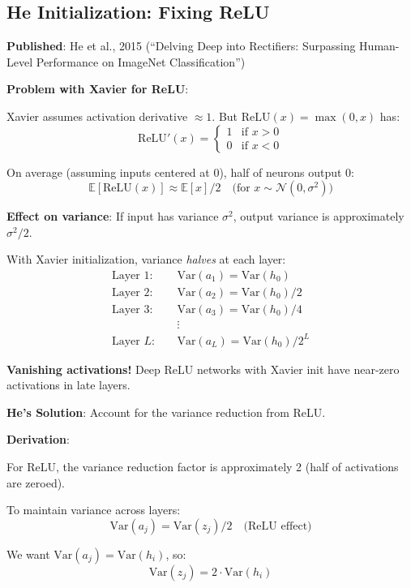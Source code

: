 \documentclass[11pt,oneside]{book}
\begin{document}
\subsection{He Initialization: Fixing ReLU}

\textbf{Published}: He et al., 2015 (``Delving Deep into Rectifiers: Surpassing Human-Level Performance on ImageNet Classification'')

\textbf{Problem with Xavier for ReLU}:

Xavier assumes activation derivative $\approx 1$. But $\text{ReLU}(x) = \max(0, x)$ has:
\[
\text{ReLU}'(x) = \begin{cases}
1 & \text{if } x > 0 \\
0 & \text{if } x < 0
\end{cases}
\]

On average (assuming inputs centered at 0), half of neurons output 0:
\[
\mathbb{E}[\text{ReLU}(x)] \approx \mathbb{E}[x]/2 \quad \text{(for } x \sim \mathcal{N}(0, \sigma^2)\text{)}
\]

\textbf{Effect on variance}: If input has variance $\sigma^2$, output variance is approximately $\sigma^2/2$.

With Xavier initialization, variance \textit{halves} at each layer:
\begin{align*}
\text{Layer 1:} \quad & \text{Var}(a_1) = \text{Var}(h_0) \\
\text{Layer 2:} \quad & \text{Var}(a_2) = \text{Var}(h_0)/2 \\
\text{Layer 3:} \quad & \text{Var}(a_3) = \text{Var}(h_0)/4 \\
&\vdots \\
\text{Layer } L: \quad & \text{Var}(a_L) = \text{Var}(h_0)/2^L
\end{align*}

\textbf{Vanishing activations!} Deep ReLU networks with Xavier init have near-zero activations in late layers.

\textbf{He's Solution}: Account for the variance reduction from ReLU.

\textbf{Derivation}:

For ReLU, the variance reduction factor is approximately 2 (half of activations are zeroed).

To maintain variance across layers:
\[
\text{Var}(a_j) = \text{Var}(z_j)/2 \quad \text{(ReLU effect)}
\]

We want $\text{Var}(a_j) = \text{Var}(h_i)$, so:
\[
\text{Var}(z_j) = 2 \cdot \text{Var}(h_i)
\]
\end{document}
